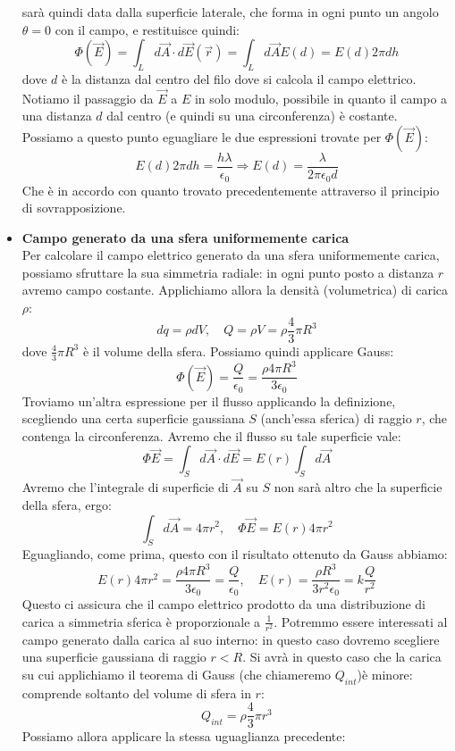\documentclass[a4paper,12pt]{article}
\begin{document}
\begin{itemize}
sarà quindi data dalla superficie laterale, che forma in ogni punto un angolo $\theta = 0$ con il campo, e restituisce quindi:
$$ \Phi(\vec{E}) = \int_L d\vec{A} \cdot d\vec{E}(\vec{r}) = \int_L d\vec{A}E(d) = E(d) 2\pi d h $$
dove $d$ è la distanza dal centro del filo dove si calcola il campo elettrico. Notiamo il passaggio da $\vec{E}$ a $E$ in solo modulo, possibile
in quanto il campo a una distanza $d$ dal centro (e quindi su una circonferenza) è costante.
Possiamo a questo punto eguagliare le due espressioni trovate per $\Phi(\vec{E})$:
$$ E(d)2\pi d h = \frac{h\lambda}{\epsilon_0} \Rightarrow E(d) = \frac{\lambda}{2\pi \epsilon_0 d} $$
Che è in accordo con quanto trovato precedentemente attraverso il principio di sovrapposizione.
\item \textbf{Campo generato da una sfera uniformemente carica} \\
Per calcolare il campo elettrico generato da una sfera uniformemente carica, possiamo sfruttare la sua simmetria radiale: in ogni punto posto a distanza
$r$ avremo campo costante. Applichiamo allora la densità (volumetrica) di carica $\rho$:
$$ dq = \rho dV, \quad Q = \rho V = \rho \frac{4}{3}\pi R^3 $$
dove $\frac{4}{3}\pi R^3$ è il volume della sfera. Possiamo quindi applicare Gauss:
$$ \Phi(\vec{E}) = \frac{Q}{\epsilon_0} = \frac{\rho4\pi R^3}{3\epsilon_0} $$
Troviamo un'altra espressione per il flusso applicando la definizione, scegliendo una certa superficie gaussiana $S$ (anch'essa sferica)
di raggio $r$, che contenga la circonferenza. Avremo che il flusso su tale superficie vale:
$$ \Phi{\vec{E}} = \int_S d\vec{A} \cdot d\vec{E} = E(r)\int_S d\vec{A} $$
Avremo che l'integrale di superficie di $\vec{A}$ su $S$ non sarà altro che la superficie della sfera, ergo:
$$ \int_S d\vec{A} = 4\pi r^2, \quad \Phi{\vec{E}} = E(r)4\pi r^2 $$
Eguagliando, come prima, questo con il risultato ottenuto da Gauss abbiamo:
$$ E(r) 4\pi r^2 = \frac{\rho4\pi R^3}{3\epsilon_0} = \frac{Q}{\epsilon_0}, \quad E(r) = \frac{\rho R^3}{3r^2 \epsilon_0} = k \frac{Q}{r^2} $$
Questo ci assicura che il campo elettrico prodotto da una distribuzione di carica a simmetria sferica è
proporzionale a $\frac{1}{r^2}$. Potremmo essere interessati al campo generato dalla carica al suo interno: in questo caso
dovremo scegliere una superficie gaussiana di raggio $r < R$. Si avrà in questo caso che la carica su cui applichiamo il teorema di Gauss
(che chiameremo $Q_{int}$)è minore: comprende soltanto del volume di sfera in $r$:
$$ Q_{int} = \rho \frac{4}{3} \pi r^3 $$
Possiamo allora applicare la stessa uguaglianza precedente:

\end{itemize}
\end{document}
